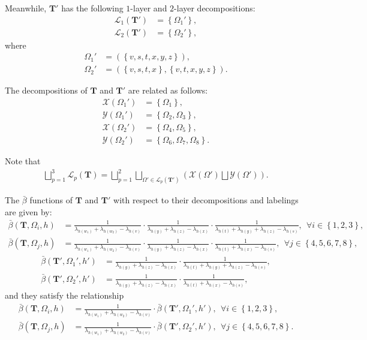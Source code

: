 \documentclass[superscriptaddress,onecolumn,nofootinbib,longbibliography,a4paper,accepted=2026-09-29]{quantumarticle}
\theoremstyle{plain}
\theoremstyle{definition}
\numberwithin{thm}{section}
\numberwithin{assumption}{section}
\numberwithin{lemma}{section}
\numberwithin{prop}{section}
\numberwithin{cor}{section}
\numberwithin{definition}{section}
\numberwithin{rmk}{section}
\numberwithin{equation}{section}
\newcommand{\lrb}[1]{\left ( #1 \right )}
\newcommand{\lrcb}[1]{\left \{ #1 \right \}}
\newcommand{\mbf}{\mathbf{T}}
\begin{document}
\begin{itemize}
Meanwhile, $\mbf'$ has the following $1$-layer and $2$-layer decompositions:
\begin{align}
\mathcal{L}_1(\mbf')&=\lrcb{\Omega_1'}, \\     
\mathcal{L}_2(\mbf')&=\lrcb{\Omega_2'},
\end{align}
where 
\begin{align}
\Omega_1'&=(\lrcb{v,s,t,x,y,z}), \\
\Omega_2'&=(\lrcb{v,s,t,x}, \lrcb{v,t,x,y,z}).
\end{align}

The decompositions of $\mbf$ and $\mbf'$ are related as follows:
\begin{align}
\mathcal{X}(\Omega_1')&=\lrcb{\Omega_1},    \\
\mathcal{Y}(\Omega_1')&=\lrcb{\Omega_2, \Omega_3}, \\
\mathcal{X}(\Omega_2')&=\lrcb{\Omega_4,\Omega_5},  \\
\mathcal{Y}(\Omega_2')&=\lrcb{\Omega_6,\Omega_7, \Omega_8}.
\end{align}

Note that
\begin{align}
\bigsqcup_{p=1}^3 \mathcal{L}_p(\mbf) = \bigsqcup_{p=1}^2 \bigsqcup_{\Omega' \in \mathcal{L}_p(\mbf')}\lrb{\mathcal{X}(\Omega') \bigsqcup \mathcal{Y}(\Omega')}.  
\end{align}

The $\bar{\beta}$ functions of $\mbf$ and $\mbf'$ with respect to their decompositions and labelings are given by:
\begin{align}
\bar{\beta}(\mbf,\Omega_i,h)&=
\frac{1}{\lambda_{h(w_1)}+\lambda_{h(w_2)}-\lambda_{h(v)}}
\cdot
\frac{1}{\lambda_{h(y)}+\lambda_{h(z)}-\lambda_{h(x)}} \cdot 
\frac{1}{\lambda_{h(t)}+\lambda_{h(y)}+\lambda_{h(z)}-\lambda_{h(s)}},~~\forall i \in \lrcb{1,2,3}, \\    
\bar{\beta}(\mbf,\Omega_j,h)&=
\frac{1}{\lambda_{h(w_1)}+\lambda_{h(w_2)}-\lambda_{h(v)}}
\cdot
\frac{1}{\lambda_{h(y)}+\lambda_{h(z)}-\lambda_{h(x)}} \cdot 
\frac{1}{\lambda_{h(t)}+\lambda_{h(x)}-\lambda_{h(s)}},~~\forall j\in \lrcb{4,5,6,7,8}, 
\end{align}
\begin{align}
\bar{\beta}(\mbf',\Omega_1',h')&=
\frac{1}{\lambda_{h(y)}+\lambda_{h(z)}-\lambda_{h(x)}} \cdot 
\frac{1}{\lambda_{h(t)}+\lambda_{h(y)}+\lambda_{h(z)}-\lambda_{h(s)}}, \\
\bar{\beta}(\mbf',\Omega_2',h')&=
\frac{1}{\lambda_{h(y)}+\lambda_{h(z)}-\lambda_{h(x)}} \cdot 
\frac{1}{\lambda_{h(t)}+\lambda_{h(x)}-\lambda_{h(s)}},    
\end{align}
and they satisfy the relationship
\begin{align}
\bar{\beta}(\mbf,\Omega_i,h)&=
\frac{1}{\lambda_{h(w_1)}+\lambda_{h(w_2)}-\lambda_{h(v)}} \cdot \bar{\beta}(\mbf',\Omega_1',h'),
~~\forall i \in \lrcb{1,2,3}, \\
\bar{\beta}(\mbf,\Omega_j,h)&=
\frac{1}{\lambda_{h(w_1)}+\lambda_{h(w_2)}-\lambda_{h(v)}} \cdot \bar{\beta}(\mbf',\Omega_2',h'),
~~\forall j \in \lrcb{4,5,6,7,8}.
\end{align}


\end{itemize}
\end{document}
